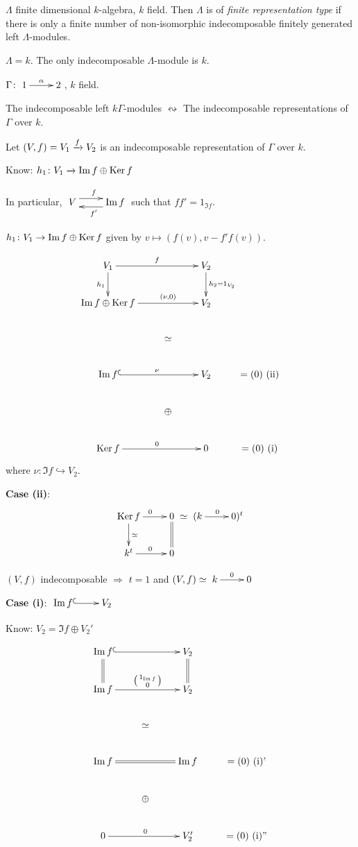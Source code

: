 \begin{defin}
$\Lambda$ finite dimensional $k$-algebra, $k$ field.  Then $\Lambda$
is of \emph{finite representation type} if there is only a finite number of non-isomorphic
indecomposable finitely generated left $\Lambda$-modules.
\end{defin}

\begin{exam}
$\Lambda = k$.  The only indecomposable $\Lambda$-module is $k$. 
\end{exam}

\begin{exam}
$\Gamma\colon \xymatrix{1\ar[r]^\alpha & 2}$, $k$ field.

The indecomposable left $k\Gamma$-modules $\leftrightsquigarrow$ The
indecomposable representations of $\Gamma$ over $k$. 

Let $(V,f) = V_1\xrightarrow{f} V_2$ is an indecomposable representation of
$\Gamma$ over $k$.

Know: $h_1\colon V_1 \xrightarrow{~} \operatorname{Im}\nolimits f\oplus \operatorname{Ker}\nolimits f$

In particular, $\xymatrix{V\ar@<1ex>[r]^f & \Im f\ar@<1ex>[l]^{f'}}$
such that $ff' = 1_{\Im f}$.

$h_1\colon V_1 \to \operatorname{Im}\nolimits f \oplus \operatorname{Ker}\nolimits f$ given by $v\mapsto (f(v), v -
f'f(v))$. 

\[\xymatrix{
V_1 \ar[rr]^f \ar[d]_{h_1} & &  V_2\ar[d]^{h_2=1_{V_2}} & \\
\Im f\oplus \Ker f \ar[rr]^-{(\nu,0)} & & V_2 & \\
& \simeq & & \\
\Im f\ar@{^(->}[rr]^\nu && V_2 & =(0) \text{\ (ii)}\\
 & \oplus & \\
\Ker f \ar[rr]^0 && 0 & = (0) \text{\ (i)}
}\]
where $\nu\colon \Im f \hookrightarrow V_2$.

\textbf{Case (ii)}: \[\xymatrix{
\Ker f \ar[r]^0\ar[d]^\simeq & 0\ar@{=}[d]\\
k^t \ar[r]^0 & 0} \simeq \xymatrix{(k\ar[r]^0 & 0)^t}\]

$(V,f)$ indecomposable $\Rightarrow$ $t = 1$ and $(V,f)\simeq
\xymatrix{k\ar[r]^0 & 0}$ 

\textbf{Case (i)}: $\xymatrix{\Im f \ar@{^(->}[r] & V_2}$

Know: $V_2 = \Im f\oplus V_2'$

\[\xymatrix{
\Im f \ar@{^(->}[rr] \ar@{=}[d] & &  V_2\ar@{=}[d] & \\
\Im f \ar[rr]^-{\left(\begin{smallmatrix}1_{\Im f} \\ 0\end{smallmatrix}\right)} & & V_2 & \\
& \simeq & & \\
\Im f\ar@{=}[rr] && \Im f & =(0) \text{\ (i)'}\\
 & \oplus & \\
0\ar[rr]^0 && V'_2 & = (0) \text{\ (i)''}
}\]


\end{exam}
